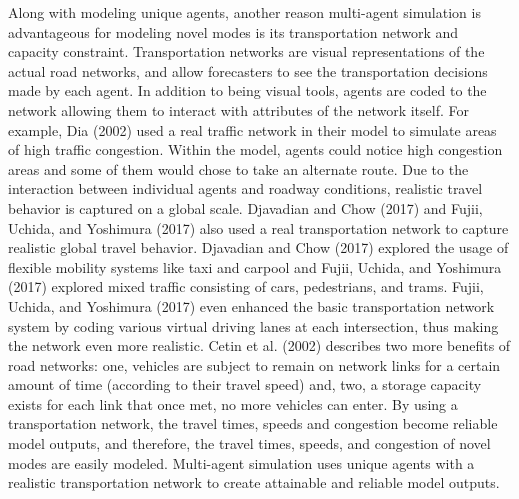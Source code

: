 \documentclass[12pt, oneside, openright]{byuthesis}
\begin{document}
Along with modeling unique agents, another reason multi-agent simulation is advantageous for modeling novel modes is its transportation network and capacity constraint. Transportation networks are visual representations of the actual road networks, and allow forecasters to see the transportation decisions made by each agent. In addition to being visual tools, agents are coded to the network allowing them to interact with attributes of the network itself. For example, Dia (2002) used a real traffic network in their model to simulate areas of high traffic congestion. Within the model, agents could notice high congestion areas and some of them would chose to take an alternate route. Due to the interaction between individual agents and roadway conditions, realistic travel behavior is captured on a global scale. Djavadian and Chow (2017) and Fujii, Uchida, and Yoshimura (2017) also used a real transportation network to capture realistic global travel behavior. Djavadian and Chow (2017) explored the usage of flexible mobility systems like taxi and carpool and Fujii, Uchida, and Yoshimura (2017) explored mixed traffic consisting of cars, pedestrians, and trams. Fujii, Uchida, and Yoshimura (2017) even enhanced the basic transportation network system by coding various virtual driving lanes at each intersection, thus making the network even more realistic. Cetin et al. (2002) describes two more benefits of road networks: one, vehicles are subject to remain on network links for a certain amount of time (according to their travel speed) and, two, a storage capacity exists for each link that once met, no more vehicles can enter. By using a transportation network, the travel times, speeds and congestion become reliable model outputs, and therefore, the travel times, speeds, and congestion of novel modes are easily modeled. Multi-agent simulation uses unique agents with a realistic transportation network to create attainable and reliable model outputs.
\end{document}
